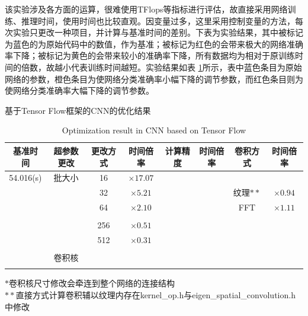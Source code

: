 \par 该实验涉及各方面的运算，很难使用TFlops等指标进行评估，故直接采用网络训练、推理时间，使用时间也比较直观。因变量过多，这里采用控制变量的方法，每次实验只更改一种项目，并计算与基准时间的差别。下表为实验结果，其中被标记为蓝色的为原始代码中的数值，作为基准；被标记为红色的会带来极大的网络准确率下降；被标记为黄色的会带来较小的准确率下降，所有数据均为相对于原训练时间的倍数，故越小代表训练时间越短。实验结果如表 \ref{table-TFRES}所示，表中蓝色条目为原始网络的参数，橙色条目为使网络分类准确率小幅下降的调节参数，而红色条目则为使网络分类准确率大幅下降的调节参数。
\begin{table}
	\centering
	\renewcommand{\thetable}{\arabic{section}-\arabic{table} }
	\renewcommand{\tablename}{表}
	\caption{基于Tensor Flow框架的CNN的优化结果}
	\addtocounter{table}{-1}
	\renewcommand{\thetable}{\arabic{section}-\arabic{table} }
	\renewcommand{\tablename}{Table}
	\caption{Optimization result in CNN based on Tensor Flow}
	\begin{tabular}{cccccccc}
		\toprule
		基准时间 &  超参数更改 &更改方式 &时间倍率 & 计算精度 &时间倍率 & 卷积方式 &时间倍率 	\\
		\midrule
		54.016(s) & 批大小 & 16 & $ \times17.07 $ & \color{blue}{FP32} & \color{blue}{$ \times 1 $ } & \color{blue}{原始(GEMM)} & \color{blue}{$ \times 1 $} \\
		 & & 32 & $ \times 5.21 $ & \color{orange}{FP16} & \color{orange}{$ \times 0.86 $} & 纹理$ ** $ & $ \times 0.94 $\\
		 & & 64 & $ \times 2.10 $ & \color{orange}{INT8} & \color{orange}{$ \times 0.82 $} & FFT & $ \times 1.11 $\\
		 & & \color{blue}{128} & \color{blue}{$ \times 1 $}& & & & \\
		 & & 256 & $ \times 0.51 $ & & & & \\
		 & & 512 & $ \times 0.31 $ & & & & \\
		 & & \color{orange}{1024} & \color{orange}{$ \times 0.21 $}& & & & \\
		 & 卷积核 & \color{blue}{$ 5\times 5 $} & \color{blue}{$ \times 1 $} & & & & \\
		 & & \color{red}{$ 8\times 8 * $} & \color{red}{$ \times 0.97 $} & & & & \\
		\bottomrule
	\end{tabular} \label{table-TFRES} 
$ * $卷积核尺寸修改会牵连到整个网络的连接结构\\
$ ** $直接方式计算卷积辅以纹理内存在kernel\_op.h与eigen\_spatial\_convolution.h中修改
\end{table}
